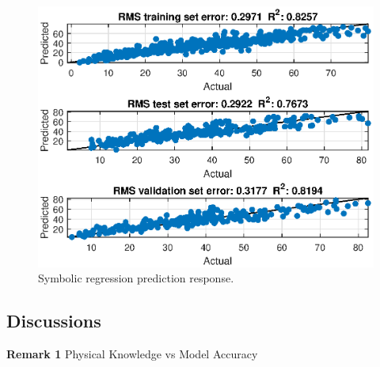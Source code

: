 \documentclass[final,5p,times,twocolumn]{elsarticle}
\begin{document}

\begin{figure}[!hptb]
	\centering
	\includegraphics[width=\linewidth,clip]{NIR7.eps}
	
	\caption{Symbolic regression prediction response.}
	\label{fig:NIR2}
\end{figure}

%

%
%
%

\subsection{Discussions}

\noindent
\textbf{Remark 1} Physical Knowledge vs Model Accuracy
\end{document}
